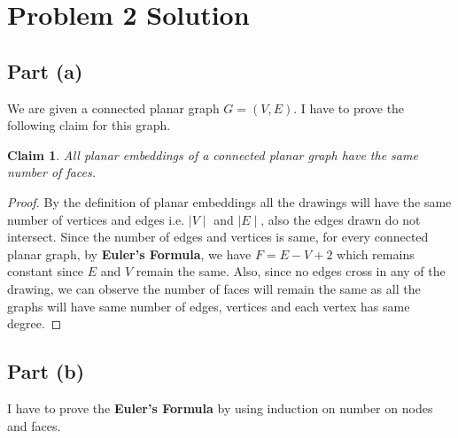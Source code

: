 \documentclass{article}
\let\bold\textbf
\newtheorem{claim}{Claim}[section]
\begin{document}
\section{Problem 2 Solution}{
  \subsection{Part (a)}{
    We are given a connected planar graph $G=(V,E)$. I have to prove the following claim for this graph.
    \begin{claim}
      All planar embeddings of a connected planar graph have the same number of faces.
    \end{claim}
    \begin{proof}
      By the definition of planar embeddings all the drawings will have the same number of vertices and edges i.e. $\mid V \mid$ and $\mid E \mid$, also the edges drawn do not intersect. \newline
      Since the number of edges and vertices is same, for every connected planar graph, by \bold{Euler's Formula}, we have $F=E-V+2$ which remains constant since $E$ and $V$ remain the same. \newline
      Also, since no edges cross in any of the drawing, we can observe the number of faces will remain the same as all the graphs will have same number of edges, vertices and each vertex has same degree.
    \end{proof}
  }
  \subsection{Part (b)}{
    I have to prove the \bold{Euler's Formula} by using induction on number on nodes and faces.
}}
\end{document}
